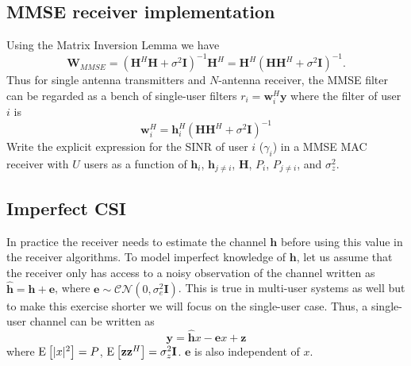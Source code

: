 \documentclass[a4paper,10pt]{article}
\newcommand{\Hb}{\mathbf{H}}
\newcommand{\I}{\mathbf{I}}
\newcommand{\W}{\mathbf{W}}
\newcommand{\h}{\mathbf{h}}
\newcommand{\x}{\mathbf{x}}
\newcommand{\y}{\mathbf{y}}
\newcommand{\w}{\mathbf{w}}
\newcommand{\e}{\mathbf{e}}
\newcommand{\z}{\mathbf{z}}
\newcommand{\Ex}[2]{{\textnormal{E}_{#1}\left[#2\right]}}
\begin{document}
%      
% 
% 

\subsection{MMSE receiver implementation}

 Using the Matrix Inversion Lemma we have $$\W_{MMSE}=\left(\Hb^H\Hb+\sigma^2\I\right)^{-1}\Hb^H=\Hb^H\left(\Hb\Hb^H+\sigma^2\I\right)^{-1}.$$
Thus for single antenna transmitters and $N$-antenna receiver, the MMSE filter can be regarded as a bench of single-user filters $r_i=\w^H_i\y$ where the filter of user $i$ is
$$\w_i^H=\h_i^H\left(\Hb\Hb^H+\sigma^2\I\right)^{-1}$$
Write the explicit expression for the SINR of user $i$ ($\gamma_i$) in a MMSE MAC receiver with $U$ users as a function of $\h_i$, $\h_{j\neq i}$, $\Hb$, $P_i$, $P_{j\neq i}$, and $\sigma_z^2$.

\subsection{Imperfect CSI}

In practice the receiver needs to estimate the channel $\h$ before using this value in the receiver algorithms. To model imperfect knowledge of $\h$, let us assume that the receiver only has access to a noisy observation of the channel written as $\hat{\h}=\h+\e$, where $\e\sim\mathcal{CN}(0,\sigma_e^2\I)$. This is true in multi-user systems as well but to make this exercise shorter we will focus on the single-user case. Thus, a single-user channel can be written as
     $$\y=\hat{\h}x-\e x+\z$$
where $\Ex{}{|x|^2}=P$,  $\Ex{}{\z\z^H}=\sigma_z^2\I$. $\e$ is also independent of $x$.
     
\end{document}
